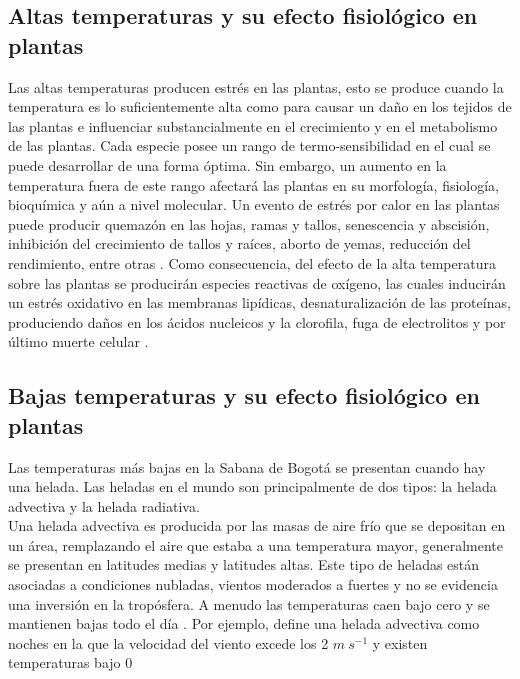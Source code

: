 \subsection{Altas temperaturas y su efecto fisiológico en plantas}

Las altas temperaturas producen estrés en las plantas, esto se produce cuando la temperatura es lo suficientemente alta como para causar un daño en los tejidos de las plantas e influenciar substancialmente en el crecimiento y en el metabolismo de las plantas. Cada especie posee un rango de termo-sensibilidad en el cual se puede desarrollar de una forma óptima. Sin embargo, un aumento en la temperatura fuera de este rango afectará las plantas en su morfología, fisiología, bioquímica y aún a nivel molecular. Un evento de estrés por calor en las plantas puede producir quemazón en las hojas, ramas y tallos, senescencia y abscisión, inhibición del crecimiento de tallos y raíces, aborto de yemas, reducción del rendimiento, entre otras \citep{Pareek1997}. Como consecuencia, del efecto de la alta temperatura sobre las plantas se producirán especies reactivas de oxígeno, las cuales inducirán un estrés oxidativo en las membranas lipídicas, desnaturalización de las proteínas, produciendo daños en los ácidos nucleicos y la clorofila, fuga de electrolitos y por último muerte celular \citep{Khan2015}.

\subsection{Bajas temperaturas y su efecto fisiológico en plantas}

Las temperaturas más bajas en la Sabana de Bogotá se presentan cuando hay una helada. Las heladas en el mundo son principalmente de dos tipos: la helada advectiva y la helada radiativa.\\

Una helada advectiva es producida por las masas de aire frío que se depositan en un área, remplazando el aire que estaba a una temperatura mayor, generalmente se presentan en latitudes medias y latitudes altas. Este tipo de  heladas están asociadas a condiciones nubladas, vientos moderados a fuertes y no se evidencia una inversión en la tropósfera. A menudo las temperaturas caen bajo cero y se mantienen bajas todo el día \citep{Prabha2008a, IDEAM2012a}. Por ejemplo, \citet{Prabha2008a} define una helada advectiva como noches en la que la velocidad del viento excede los 2 $m\ s^{-1}$ y existen temperaturas bajo 0\celc \.\\


